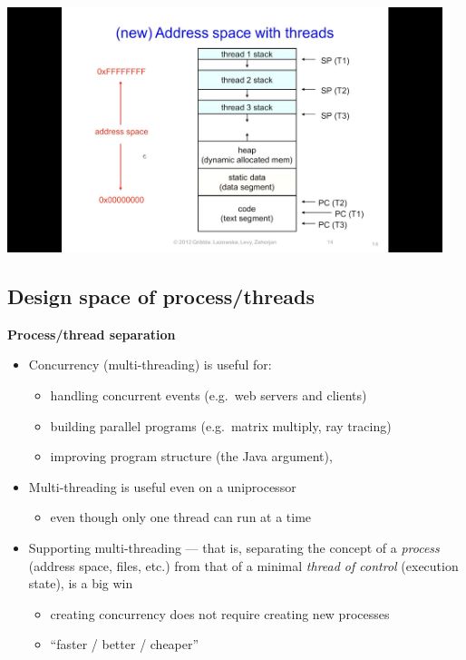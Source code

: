 \documentclass[11pt,a4paper]{article}
\begin{document}
\includegraphics[height=270]{process-address-space-threads.jpg}

\subsection{Design space of process/threads}

\textbf{Process/thread separation}
\begin{itemize}
    \item Concurrency (multi-threading) is useful for:
        \begin{itemize}
            \item handling concurrent events (e.g.\ web servers and clients)
            \item building parallel programs (e.g.\ matrix multiply, ray tracing)
            \item improving program structure (the Java argument),
        \end{itemize}
    \item Multi-threading is useful even on a uniprocessor
        \begin{itemize}
            \item even though only one thread can run at a time
        \end{itemize}
    \item Supporting multi-threading --- that is, separating the concept of a \emph{process}
        (address space, files, etc.) from that of a minimal \emph{thread of control}
        (execution state), is a big win
        \begin{itemize}
            \item creating concurrency does not require creating new processes
            \item ``faster / better / cheaper''
        \end{itemize}
\end{itemize}
\end{document}
